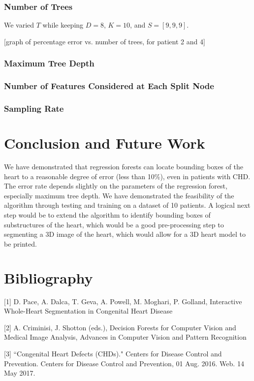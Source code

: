 \subsubsection{Number of Trees} We varied $T$ while keeping $D=8$, $K=10$, and $S=[9,9,9]$.

[graph of percentage error vs. number of trees, for patient 2 and 4]
\subsubsection{Maximum Tree Depth}
\subsubsection{Number of Features Considered at Each Split Node}
\subsubsection{Sampling Rate}

\section{Conclusion and Future Work}
We have demonstrated that regression forests can locate bounding boxes of the heart to a reasonable degree of error (less than 10\%), even in patients with CHD. The error rate depends slightly on the parameters of the regression forest, especially maximum tree depth. We have demonstrated the feasibility of the algorithm through testing and training on a dataset of 10 patients. A logical next step would be to extend the algorithm to identify bounding boxes of substructures of the heart, which would be a good pre-processing step to segmenting a 3D image of the heart, which would allow for a 3D heart model to be printed.

\section{Bibliography}
[1] D. Pace, A. Dalca, T. Geva, A. Powell, M. Moghari, P. Golland, Interactive Whole-Heart Segmentation in Congenital Heart Disease

[2] A. Criminisi, J. Shotton (eds.), Decision Forests for Computer Vision and Medical Image Analysis, Advances in Computer Vision and Pattern Recognition

[3] ``Congenital Heart Defects (CHDs)." Centers for Disease Control and Prevention. Centers for Disease Control and Prevention, 01 Aug. 2016. Web. 14 May 2017.

